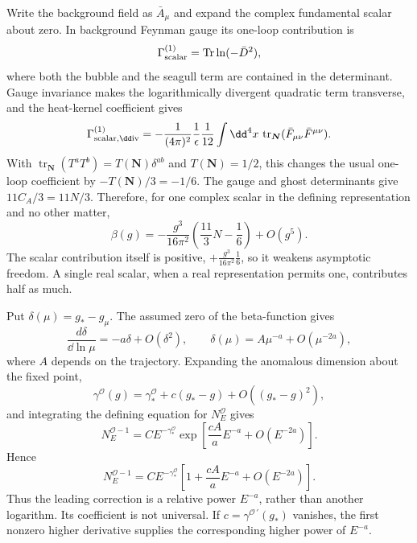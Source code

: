 \ExerciseEditorialNote

\begin{enumerate}
  Write the background field as \(\bar A_\mu\) and expand the complex
  fundamental scalar about zero.  In background Feynman gauge its one-loop
  contribution is
  \[
    \Gamma_{\rm scalar}^{(1)}
      =\operatorname{Tr}\ln(-\bar D^2),
  \]
  where both the bubble and the seagull term are contained in the
  determinant.  Gauge invariance makes the logarithmically divergent
  quadratic term transverse, and the heat-kernel coefficient gives
  \[
    \Gamma_{\rm scalar,\dd iv}^{(1)}
      =-\frac{1}{(4\pi)^2}\frac{1}{\epsilon}
        \frac{1}{12}\int \dd^4x\,
        \operatorname{tr}_{\boldsymbol N}
        (\bar F_{\mu\nu}\bar F^{\mu\nu}).
  \]
  With
  \(\operatorname{tr}_{\boldsymbol N}(T^aT^b)
    =T(\boldsymbol N)\delta^{ab}\) and
  \(T(\boldsymbol N)=1/2\), this changes the usual one-loop coefficient by
  \(-T(\boldsymbol N)/3=-1/6\).  The gauge and ghost determinants give
  \(11C_A/3=11N/3\).  Therefore, for one complex scalar in the defining
  representation and no other matter,
  \[
    \boxed{\beta(g)
      =-\frac{g^3}{16\pi^2}
        \left(\frac{11}{3}N-\frac{1}{6}\right)
        +O(g^5).}
  \]
  The scalar contribution itself is positive,
  \(+\frac{g^3}{16\pi^2}\frac16\), so it weakens asymptotic freedom.  A
  single real scalar, when a real representation permits one, contributes
  half as much.

  Put
  \(\delta(\mu)=g_*-g_\mu\).  The assumed zero of the beta-function gives
  \[
    \frac{d\delta}{\dd\ln\mu}=-a\delta+O(\delta^2),
    \qquad
    \delta(\mu)=A\mu^{-a}+O(\mu^{-2a}),
  \]
  where \(A\) depends on the trajectory.  Expanding the anomalous dimension
  about the fixed point,
  \[
    \gamma^{\mathcal O}(g)
      =\gamma_*^{\mathcal O}
       +c(g_*-g)+O((g_*-g)^2),
  \]
  and integrating the defining equation for \(N_E^{\mathcal O}\) gives
  \[
    N_E^{\mathcal O-1}
      =C E^{-\gamma_*^{\mathcal O}}
       \exp\left[\frac{cA}{a}E^{-a}
       +O(E^{-2a})\right].
  \]
  Hence
  \[
    \boxed{N_E^{\mathcal O-1}
      =C E^{-\gamma_*^{\mathcal O}}
       \left[1+\frac{cA}{a}E^{-a}
       +O(E^{-2a})\right].}
  \]
  Thus the leading correction is a relative power \(E^{-a}\), rather than
  another logarithm.  Its coefficient is not universal.  If
  \(c=\gamma^{\mathcal O\,\prime}(g_*)\) vanishes, the first nonzero higher
  derivative supplies the corresponding higher power of \(E^{-a}\).


\end{enumerate}
